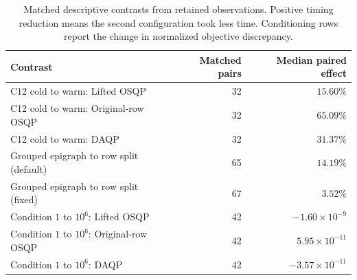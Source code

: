 \begin{table}[htbp]\centering\small
\caption{Matched descriptive contrasts from retained observations. Positive timing reduction means the second configuration took less time. Conditioning rows report the change in normalized objective discrepancy.}\label{tab:component-comparisons}
\begin{tabularx}{\textwidth}{@{}Xrr@{}}\toprule
Contrast & Matched pairs & Median paired effect\\\midrule
C12 cold to warm: Lifted OSQP & 32 & $15.60\%$\\
C12 cold to warm: Original-row OSQP & 32 & $65.09\%$\\
C12 cold to warm: DAQP & 32 & $31.37\%$\\
Grouped epigraph to row split (default) & 65 & $14.19\%$\\
Grouped epigraph to row split (fixed) & 67 & $3.52\%$\\
Condition $1$ to $10^6$: Lifted OSQP & 42 & $-1.60\times 10^{-9}$\\
Condition $1$ to $10^6$: Original-row OSQP & 42 & $5.95\times 10^{-11}$\\
Condition $1$ to $10^6$: DAQP & 42 & $-3.57\times 10^{-11}$\\
\bottomrule
\end{tabularx}
\end{table}
